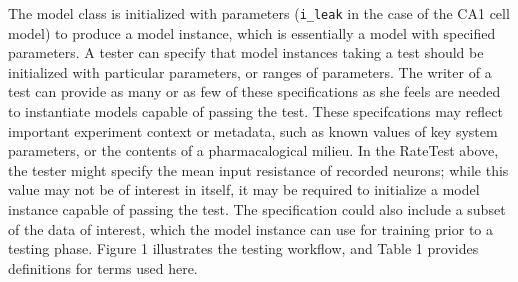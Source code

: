 \documentclass[11pt,letterpaper]{article}
\begin{document}
The model class is initialized with parameters (\verb|i_leak| in the case of the CA1 cell model) to produce a model instance, which is essentially a model with specified parameters.  A tester can specify that model instances taking a test should be initialized with particular parameters, or ranges of parameters. The writer of a test can provide as many or as few of these specifications as she feels are needed to instantiate models capable of passing the test.  These specifcations may reflect important experiment context or metadata, such as known values of key system parameters, or the contents of a pharmacalogical milieu.  In the RateTest above, the tester might specify the mean input resistance of recorded neurons; while this value may not be of interest in itself, it may be required to initialize a model instance capable of passing the test.  The specification could also include a subset of the data of interest, which the model instance can use for training prior to a testing phase.  Figure 1 illustrates the testing workflow, and Table 1 provides definitions for terms used here.  

\end{document}
